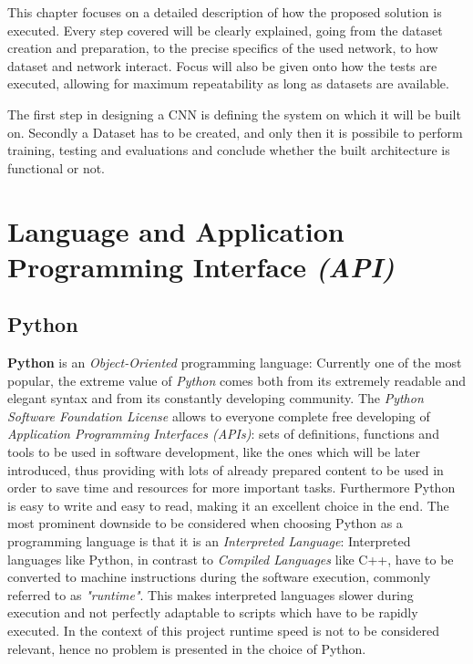 \documentclass[../main.tex]{subfiles}
\begin{document}
\label{capitolo3}
\thispagestyle{empty}

This chapter focuses on a detailed description of how the proposed solution is executed. Every step covered will be clearly explained, going from the dataset creation and preparation, to the precise specifics of the used network, to how dataset and network interact. Focus will also be given onto how the tests are executed, allowing for maximum repeatability as long as datasets are available.

The first step in designing a CNN is defining the system on which it will be built on. Secondly a Dataset has to be created, and only then it is possibile to perform training, testing and evaluations and conclude whether the built architecture is functional or not. 

\section{Language and Application Programming Interface \textit{(API)}}
\subsection{Python}
\textbf{Python} is an \textit{Object-Oriented} programming language: Currently one of the most popular, the extreme value of \textit{Python} comes both from its extremely readable and elegant syntax and from its constantly developing community. The \textit{Python Software Foundation License}\cite{pythonlicense}	allows to everyone complete free developing of \textit{Application Programming Interfaces (APIs)}: sets of definitions, functions and tools to be used in software development, like the ones which will be later introduced, thus providing with lots of already prepared content to be used in order to save time and resources for more important tasks. Furthermore Python is easy to write and easy to read, making it an excellent choice in the end. The most prominent downside to be considered when choosing Python as a programming language is that it is an \textit{Interpreted Language}: Interpreted languages like Python, in contrast to \textit{Compiled Languages} like C++, have to be converted to machine instructions during the software execution, commonly referred to as \textit{"runtime"}. This makes interpreted languages slower during execution and not perfectly adaptable to scripts which have to be rapidly executed. In the context of this project runtime speed is not to be considered relevant, hence no problem is presented in the choice of Python.
\vspace{5mm}
\end{document}
